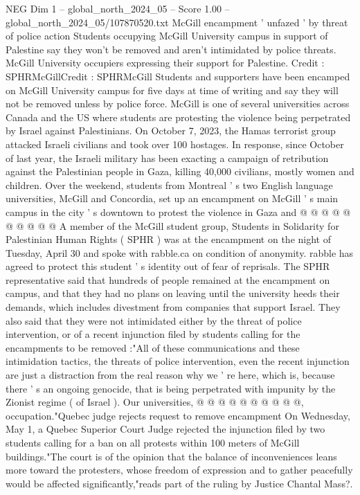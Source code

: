 \begin{textsample}{NEG Dim 1 – global\_north\_2024\_05 – Score 1.00 – global\_north\_2024\_05/107870520.txt}  \label{ex:f1_neg_048}
McGill encampment ' unfazed ' by threat of police action Students occupying McGill University campus in support of Palestine say they won't be removed and aren't intimidated by police threats.
McGill University occupiers expressing their support for Palestine.
Credit : SPHRMcGillCredit : SPHRMcGill Students and supporters have been encamped on McGill University campus for five days at time of writing and say they will not be removed unless by police force.
McGill is one of several universities across Canada and the US where students are protesting the violence being perpetrated by Israel against Palestinians.
On October 7, 2023, the Hamas terrorist group attacked Israeli civilians and took over 100 hostages.
In response, since October of last year, the Israeli military has been exacting a campaign of retribution against the Palestinian people in Gaza, killing 40,000 civilians, mostly women and children.
Over the weekend, students from Montreal ' s two English language universities, McGill and Concordia, set up an encampment on McGill ' s main campus in the city ' s downtown to protest the violence in Gaza and @ @ @ @ @ @ @ @ @ @ A member of the McGill student group, Students in Solidarity for Palestinian Human Rights ( SPHR ) was at the encampment on the night of Tuesday, April 30 and spoke with rabble.ca on condition of anonymity. rabble has agreed to protect this student ' s identity out of fear of reprisals.
The SPHR representative said that hundreds of people remained at the encampment on campus, and that they had no plans on leaving until the university heeds their demands, which includes divestment from companies that support Israel.
They also said that they were not intimidated either by the threat of police intervention, or of a recent injunction filed by students calling for the encampments to be removed :"All of these communications and these intimidation tactics, the threats of police intervention, even the recent injunction are just a distraction from the real reason why we ' re here, which is, because there ' s an ongoing genocide, that is being perpetrated with impunity by the Zionist regime ( of Israel ).
Our universities, @ @ @ @ @ @ @ @ @ @, occupation."Quebec judge rejects request to remove encampment On Wednesday, May 1, a Quebec Superior Court Judge rejected the injunction filed by two students calling for a ban on all protests within 100 meters of McGill buildings."The court is of the opinion that the balance of inconveniences leans more toward the protesters, whose freedom of expression and to gather peacefully would be affected significantly,"reads part of the ruling by Justice Chantal Mass?.

\end{textsample}
